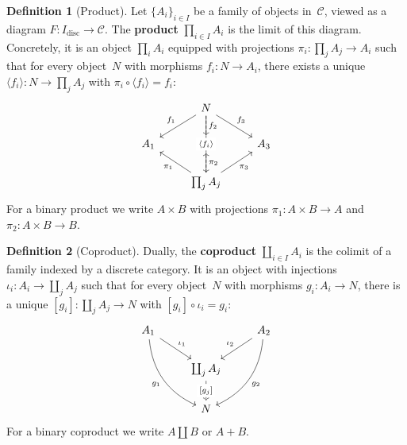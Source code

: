 \documentclass[a4paper,12pt]{book}
\theoremstyle{definition}
\newtheorem{definition}{Definition}[section]
\theoremstyle{plain}
\theoremstyle{remark}
\begin{document}
\begin{definition}[Product]\label{def:product}
Let $\{A_i\}_{i\in I}$ be a family of objects in~$\mathcal{C}$,
viewed as a diagram $F\colon I_{\mathrm{disc}}\to\mathcal{C}$.
The \textbf{product} $\prod_{i\in I} A_i$ is the limit of this diagram.
Concretely, it is an object $\prod_{i} A_i$ equipped with projections
$\pi_i\colon \prod_j A_j\to A_i$ such that for every object~$N$
with morphisms $f_i\colon N\to A_i$, there exists a unique
$\langle f_i \rangle\colon N\to\prod_j A_j$ with
$\pi_i\circ\langle f_i \rangle = f_i$:
\[
\begin{tikzcd}
& N \arrow[dl, "f_1"'] \arrow[d, "f_2"] \arrow[dr, "f_3"]
      \arrow[dd, dashed, "\langle f_i\rangle" description] & \\
A_1 & A_2 & A_3 \\
& \prod_j A_j \arrow[ul, "\pi_1"] \arrow[u, "\pi_2"'] \arrow[ur, "\pi_3"'] &
\end{tikzcd}
\]
For a binary product we write $A\times B$ with projections
$\pi_1\colon A\times B\to A$ and $\pi_2\colon A\times B\to B$.
\end{definition}

\begin{definition}[Coproduct]\label{def:coproduct}
Dually, the \textbf{coproduct} $\coprod_{i\in I} A_i$ is the
colimit of a family indexed by a discrete category.
It is an object with injections $\iota_i\colon A_i\to\coprod_j A_j$
such that for every object~$N$ with morphisms $g_i\colon A_i\to N$,
there is a unique $[g_i]\colon\coprod_j A_j\to N$
with $[g_i]\circ\iota_i = g_i$:
\[
\begin{tikzcd}
A_1 \arrow[dr, "\iota_1"] \arrow[ddr, bend right, "g_1"'] & &
A_2 \arrow[dl, "\iota_2"'] \arrow[ddl, bend left, "g_2"] \\
& \coprod_j A_j \arrow[d, dashed, "{[g_j]}" description] & \\
& N &
\end{tikzcd}
\]
For a binary coproduct we write $A\amalg B$ or $A + B$.
\end{definition}
\end{document}
